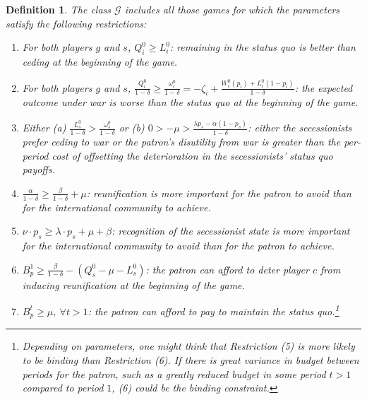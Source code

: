 \documentclass[11pt,letterpaper, notitlepage]{article}
\newtheorem{definition}{Definition}
\newcommand{\de}{\delta}
\begin{document}
\begin{definition}
\emph{The class $\mathcal{G}$ includes all those games for which the parameters satisfy the following restrictions:}

\begin{enumerate}
\item \textit{For both players $g$ and $s$, $Q_i^0 \geq L_i^0$: remaining in the status quo is better than ceding at the beginning of the game.}\label{res:1}

\item \textit{For both players $g$ and $s$, $\frac {Q_i^0}{1-\delta} \geq \frac {\omega_i^0}{1-\delta} = -\zeta_i+\frac{W_i^0(p_i) + L_i^0(1-p_i)}{1-\delta}$: the expected outcome under war is worse than the status quo at the beginning of the game.}\label{res:2}

\item \textit{Either (a) $\frac{L_s^0}{1-\delta}  > \frac{\omega_s^0}{1-\delta}$ or (b) $0 > -\mu > \frac{\lambda p_s - \alpha (1-p_s)}{1-\de}$: either the secessionists prefer ceding to war or the patron's disutility from war is greater than the per-period cost of offsetting the deterioration in the secessionists' status quo payoffs.}\label{res:new}

\item \textit{$\frac{\alpha}{1-\de} \geq \frac{\beta}{1-\de} + \mu$: reunification is more important for the patron to avoid than for the international community to achieve.}\label{res:3}

\item  \textit{$\nu\cdot p_s \geq \lambda \cdot p_s + \mu + \beta$: recognition of the secessionist state is more important for the international community to avoid than for the patron to achieve.}\label{res:4}

\item  \textit{$B_p^1 \geq\frac{\beta}{1-\delta} - \left(Q_s^0 -\mu - L_s^0 \right)$: the patron can afford to deter player $c$ from inducing reunification at the beginning of the game.}\label{res:5}

\item \textit{$B_p^t \geq \mu, \ \forall t>1$: the patron can afford to pay to maintain the status quo.}\footnote{Depending on parameters, one might think that Restriction (5) is more likely to be binding than Restriction (6). If there is great variance in budget between periods for the patron, such as a greatly reduced budget in some period $t> 1$ compared to period $1$, (6) could be the binding constraint.}\label{res:6}

\end{enumerate}
\end{definition}
\end{document}

